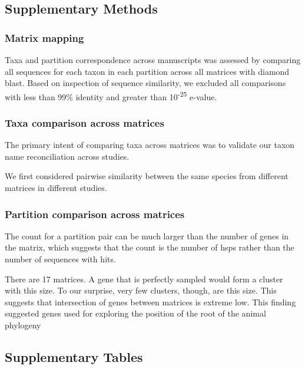 \documentclass[]{article}
\begin{document}
\hypertarget{supplementary-methods}{%
\subsection{Supplementary Methods}\label{supplementary-methods}}

\hypertarget{matrix-mapping}{%
\subsubsection{Matrix mapping}\label{matrix-mapping}}

Taxa and partition correspondence across manuscripts was assessed by
comparing all sequences for each taxon in each partition across all
matrices with diamond blast. Based on inspection of sequence similarity,
we excluded all comparisons with less than 99\% identity and greater
than 10\textsuperscript{-25} e-value.

\hypertarget{taxa-comparison-across-matrices}{%
\subsubsection{Taxa comparison across
matrices}\label{taxa-comparison-across-matrices}}

The primary intent of comparing taxa across matrices was to validate our
taxon name reconciliation across studies.

We first considered pairwise similarity between the same species from
different matrices in different studies.

\hypertarget{partition-comparison-across-matrices}{%
\subsubsection{Partition comparison across
matrices}\label{partition-comparison-across-matrices}}

The count for a partition pair can be much larger than the number of
genes in the matrix, which suggests that the count is the number of hsps
rather than the number of sequences with hits.

There are 17 matrices. A gene that is perfectly sampled would form a
cluster with this size. To our surprise, very few clusters, though, are
this size. This suggests that intersection of genes between matrices is
extreme low. This finding suggested genes used for exploring the
position of the root of the animal phylogeny

\hypertarget{supplementary-tables}{%
\subsection{Supplementary Tables}\label{supplementary-tables}}
\end{document}

